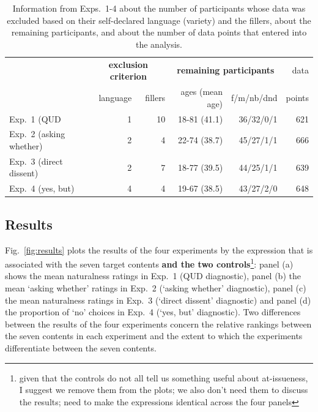 \documentclass[times,linguex,xcolor]{glossa}
\begin{document}
  \begin{table}[h!]
  \centering
  \begin{tabular}{l | r r | r r  | r }
               & \multicolumn{2}{c|}{\bf exclusion criterion} & \multicolumn{2}{c|}{\bf remaining participants} & data \\ 
              & language & fillers & ages (mean age) & f/m/nb/dnd &  points \\ \hline
  Exp.~1 (QUD   & 1 &  10 &  18-81 (41.1) & 36/32/0/1 & 621 \\ 
  Exp.~2 (asking whether) &  2 &  4 & 22-74 (38.7) & 45/27/1/1 & 666 \\ 
  Exp.~3  (direct dissent) &  2 &  7 & 18-77 (39.5) & 44/25/1/1  & 639 \\ 
  Exp.~4  (yes, but) & 4 & 4 & 19-67 (38.5)  & 43/27/2/0 & 648 \\ 
  \hline
  \end{tabular}
  \caption{Information from Exps.~1-4 about the number of participants whose data was excluded based on their self-declared language (variety) and the fillers, about the remaining participants, and about the number of data points that entered into the analysis.}\label{t:excluded}
  \end{table}

  \subsection{Results}
  
  Fig.~\ref{fig:results} plots the results of the four experiments by the expression that is associated with the seven target contents {\bf and the two controls}\footnote{given that the controls do not all tell us something useful about at-issueness, I suggest we remove them from the plots; we also don't need them to discuss the results; need to make the expressions identical across the four panels}: panel (a) shows the mean naturalness ratings in Exp.~1 (QUD diagnostic), panel (b) the mean `asking whether' ratings in Exp.~2 (`asking whether' diagnostic), panel (c) the mean naturalness ratings in Exp.~3 (`direct dissent' diagnostic) and panel (d) the proportion of `no' choices in Exp.~4 (`yes, but' diagnostic). Two differences between the results of the four experiments concern the relative rankings between the seven contents in each experiment and the extent to which the experiments differentiate between the seven contents. 
  
\end{document}
